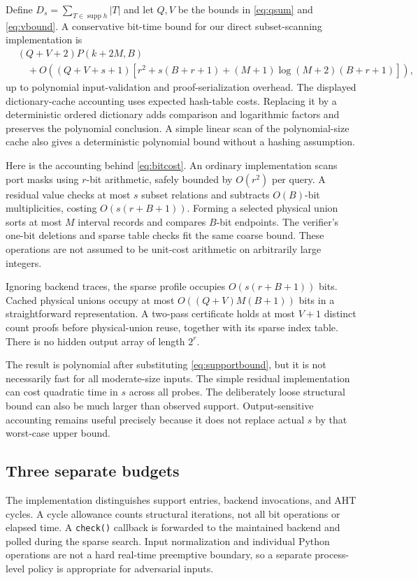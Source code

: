 \documentclass[11pt]{article}
\theoremstyle{definition}
\newcommand{\supp}{\operatorname{supp}}
\begin{document}
Define $D_s=\sum_{T\in\supp h}|T|$ and let $Q,V$ be the bounds in
\eqref{eq:qsum} and \eqref{eq:vbound}. A conservative bit-time bound for
our direct subset-scanning implementation is
\begin{equation}
\begin{split}
 &(Q+V+2)P(k+2M,B)\\
 &\quad+O\left((Q+V+s+1)
 \left[r^2+s(B+r+1)
 +(M+1)\log(M+2)(B+r+1)\right]\right),
\end{split}
\label{eq:bitcost}
\end{equation}
up to polynomial input-validation and proof-serialization overhead.
The displayed dictionary-cache accounting uses expected hash-table costs.
Replacing it by a deterministic ordered dictionary adds comparison and
logarithmic factors and preserves the polynomial conclusion. A simple
linear scan of the polynomial-size cache also gives a deterministic
polynomial bound without a hashing assumption.

Here is the accounting behind \eqref{eq:bitcost}. An ordinary implementation
scans port masks using $r$-bit arithmetic, safely bounded by $O(r^2)$ per
query. A residual value checks at most $s$ subset relations and subtracts
$O(B)$-bit multiplicities, costing $O(s(r+B+1))$. Forming a selected physical
union sorts at most $M$ interval records and compares $B$-bit endpoints.
The verifier's one-bit deletions and sparse table checks fit the same
coarse bound. These operations are not assumed to be unit-cost arithmetic
on arbitrarily large integers.

Ignoring backend traces, the sparse profile occupies $O(s(r+B+1))$ bits.
Cached physical unions occupy at most $O((Q+V)M(B+1))$ bits in a straightforward
representation. A two-pass certificate holds at most $V+1$ distinct count
proofs before physical-union reuse, together with its sparse index table.
There is no hidden output array of length $2^r$.

The result is polynomial after substituting \eqref{eq:supportbound}, but
it is not necessarily fast for all moderate-size inputs. The simple
residual implementation can cost quadratic time in $s$ across all probes.
The deliberately loose structural bound can also be much larger than
observed support. Output-sensitive accounting remains useful precisely
because it does not replace actual $s$ by that worst-case upper bound.

\subsection{Three separate budgets}
The implementation distinguishes support entries, backend invocations,
and AHT cycles. A cycle allowance counts structural iterations, not all
bit operations or elapsed time. A \texttt{check()} callback is forwarded
to the maintained backend and polled during the sparse search. Input
normalization and individual Python operations are not a hard real-time
preemptive boundary, so a separate process-level policy is appropriate
for adversarial inputs.
\end{document}
